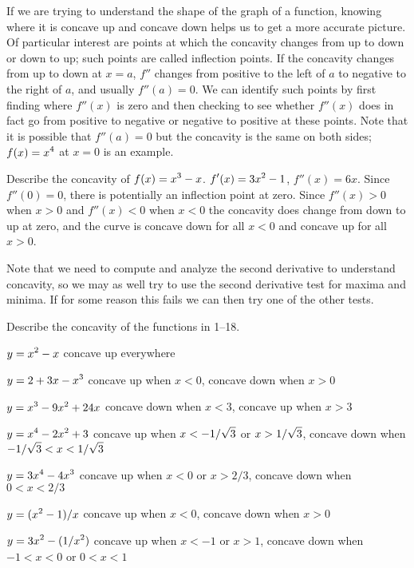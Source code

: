 If we are trying to understand the shape of the graph of a function,
knowing where it is concave up and concave down helps us to get a more
accurate picture. Of particular interest are points at which the
concavity changes from up to down or down to up; such points are
called {\dfont inflection points.} If the
concavity changes from up to down at $x=a$, $f''$ changes from
positive to the left of $a$ to negative to the right of $a$, and
usually $f''(a)=0$. We can identify such points by first finding where
$f''(x)$ is zero and then checking to see whether $f''(x)$ does in
fact go from positive to negative or negative to positive at these
points. Note that it is possible that $f''(a)=0$ but the concavity is
the same on both sides; $\displaystyle f(x)=x^4$ at $x=0$ is an example.

\example
Describe the concavity of $\displaystyle f(x)=x^3-x$. $\displaystyle f'(x)=3x^2-1$, $f''(x)=6x$.
Since $f''(0)=0$, there is potentially an inflection point at
zero. Since $f''(x)>0$ when $x>0$ and $f''(x)<0$ when $x<0$ the
concavity does change from down to up at zero, and the curve is
concave down for all $x<0$ and concave up for all $x>0$.
\endexample

Note that we need to compute and analyze the second derivative to
understand concavity, so we may as well try to use the second
derivative test for maxima and minima. If for some reason this fails
we can then try one of the other tests.

\exercises
Describe the concavity of the functions in 1--18.

\twocol

\exercise $\displaystyle y=x^2-x$ 
\answer concave up everywhere
\endanswer
\endexercise

\exercise $\displaystyle y=2+3x-x^3$ 
\answer concave up when $x<0$, concave down when $x>0$
\endanswer
\endexercise

\exercise $\displaystyle y=x^3-9x^2+24x$
\answer concave down when $x<3$, concave up when $x>3$
\endanswer
\endexercise

\exercise $\displaystyle y=x^4-2x^2+3$ 
\answer concave up when $\displaystyle x<-1/\sqrt3$ or $\displaystyle x>1/\sqrt3$,
concave down when $\displaystyle -1/\sqrt3<x<1/\sqrt3$
\endanswer
\endexercise

\exercise $\displaystyle y=3x^4-4x^3$
\answer concave up when $x<0$ or $x>2/3$,
concave down when $0<x<2/3$
\endanswer
\endexercise

\exercise $\displaystyle y=(x^2-1)/x$
\answer concave up when $x<0$, concave down when $x>0$
\endanswer
\endexercise

\exercise $\displaystyle y=3x^2-(1/x^2)$ 
\answer concave up when $x<-1$ or $x>1$, concave down when
$-1<x<0$ or $0<x<1$
\endanswer
\endexercise

